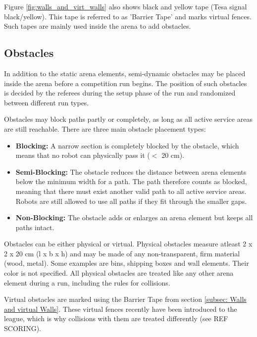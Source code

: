 Figure \ref{fig:walls_and_virt_walls} also shows black and yellow tape (Tesa signal black/yellow). 
This tape is referred to as 'Barrier Tape' and marks virtual fences. 
Such tapes are mainly used inside the arena to add obstacles.


\subsection{Obstacles}
\label{subsec: Obstacles}

In addition to the static arena elements, semi-dynamic obstacles may be placed inside the arena before a competition run begins. 
The position of such obstacles is decided by the referees during the setup phase of the run and randomized between different run types.

Obstacles may block paths partly or completely, as long as all active service areas are still reachable.
There are three main obstacle placement types:

\begin{itemize}
\item \textbf{Blocking:} 
A narrow section is completely blocked by the obstacle, which means that no robot can physically pass it ($<$ 20 cm).

\item \textbf{Semi-Blocking:} 
The obstacle reduces the distance between arena elements below the minimum width for a path. The path therefore counts as blocked, meaning that there must exist another valid path to all active service areas. Robots are still allowed to use all paths if they fit through the smaller gaps.

\item \textbf{Non-Blocking:}
The obstacle adds or enlarges an arena element but keeps all paths intact.
\end{itemize}

Obstacles can be either physical or virtual.
Physical obstacles measure atleast 2 x 2 x 20 cm (l x b x h) and may be made of any non-transparent, firm material (wood, metal). Some examples are bins, shipping boxes and wall elements. Their color is not specified.
All physical obstacles are treated like any other arena element during a run, including the rules for collisions.

Virtual obstacles are marked using the Barrier Tape from section \ref{subsec: Walls and virtual Walls}. 
These virtual fences recently have been introduced to the league, which is why collisions with them are treated differently (see REF SCORING).


